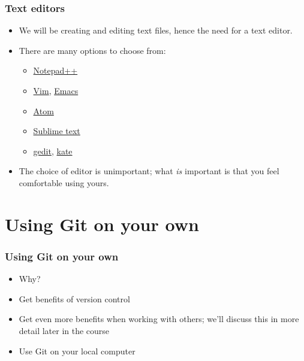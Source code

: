 \documentclass{git_course}
\begin{document}
\begin{frame}
\frametitle{Text editors}
\begin{itemize}
    \item We will be creating and editing text files, hence the need for a
        text editor.
    \item There are many options to choose from:
    \begin{itemize}
        \item \href{https://notepad-plus-plus.org/}{Notepad++}
        \item \href{https://www.vim.org/}{Vim}, \href{https://www.gnu.org/software/emacs/}{Emacs}
        \item \href{https://atom.io/}{Atom}
        \item \href{https://www.sublimetext.com/}{Sublime text}
        \item \href{https://wiki.gnome.org/Apps/Gedit}{gedit},
            \href{https://kate-editor.org/}{kate}
    \end{itemize}
    \item The choice of editor is unimportant; what \emph{is} important is
        that you feel comfortable using yours.
\end{itemize}
\end{frame}

\section{Using Git on your own}

\begin{frame}
\frametitle{Using Git on your own}
\begin{itemize}
    \item Why?
    \item Get benefits of version control
    \item Get even more benefits when working with others; we'll discuss
        this in more detail later in the course
    \item Use Git on your local computer
\end{itemize}
\end{frame}
\end{document}
